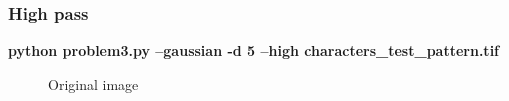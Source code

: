         \pagebreak
        \subsubsection{High pass}

        \small{\textbf{python problem3.py --gaussian -d 5 --high characters\_test\_pattern.tif}}

        \begin{figure}[!htb]\centering
            \begin{minipage}{0.45\textwidth}
                \caption{\small{Original image}}
            \end{minipage}
            \begin{minipage}{0.45\textwidth}

\end{minipage}
\end{figure}
